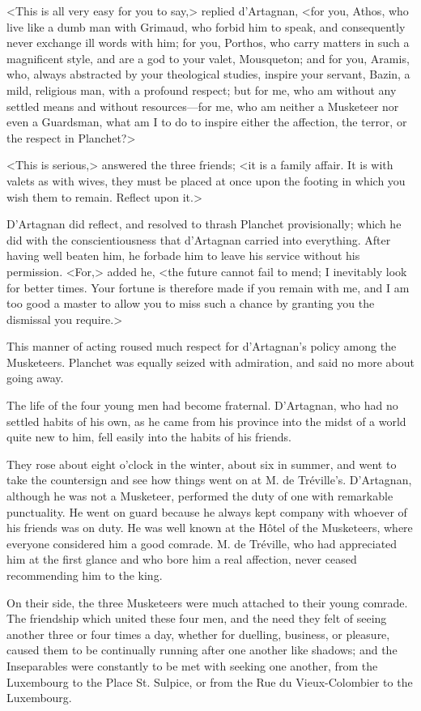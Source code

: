 <This is all very easy for you to say,> replied d'Artagnan, <for you, Athos, who live like a dumb man with Grimaud, who forbid him to speak, and consequently never exchange ill words with him; for you, Porthos, who carry matters in such a magnificent style, and are a god to your valet, Mousqueton; and for you, Aramis, who, always abstracted by your theological studies, inspire your servant, Bazin, a mild, religious man, with a profound respect; but for me, who am without any settled means and without resources---for me, who am neither a Musketeer nor even a Guardsman, what am I to do to inspire either the affection, the terror, or the respect in Planchet?> 

<This is serious,> answered the three friends; <it is a family affair. It is with valets as with wives, they must be placed at once upon the footing in which you wish them to remain. Reflect upon it.> 

D'Artagnan did reflect, and resolved to thrash Planchet provisionally; which he did with the conscientiousness that d'Artagnan carried into everything. After having well beaten him, he forbade him to leave his service without his permission. <For,> added he, <the future cannot fail to mend; I inevitably look for better times. Your fortune is therefore made if you remain with me, and I am too good a master to allow you to miss such a chance by granting you the dismissal you require.> 

This manner of acting roused much respect for d'Artagnan's policy among the Musketeers. Planchet was equally seized with admiration, and said no more about going away. 

The life of the four young men had become fraternal. D'Artagnan, who had no settled habits of his own, as he came from his province into the midst of a world quite new to him, fell easily into the habits of his friends. 

They rose about eight o'clock in the winter, about six in summer, and went to take the countersign and see how things went on at M. de Tréville's. D'Artagnan, although he was not a Musketeer, performed the duty of one with remarkable punctuality. He went on guard because he always kept company with whoever of his friends was on duty. He was well known at the Hôtel of the Musketeers, where everyone considered him a good comrade. M. de Tréville, who had appreciated him at the first glance and who bore him a real affection, never ceased recommending him to the king. 

On their side, the three Musketeers were much attached to their young comrade. The friendship which united these four men, and the need they felt of seeing another three or four times a day, whether for duelling, business, or pleasure, caused them to be continually running after one another like shadows; and the Inseparables were constantly to be met with seeking one another, from the Luxembourg to the Place St. Sulpice, or from the Rue du Vieux-Colombier to the Luxembourg. 

